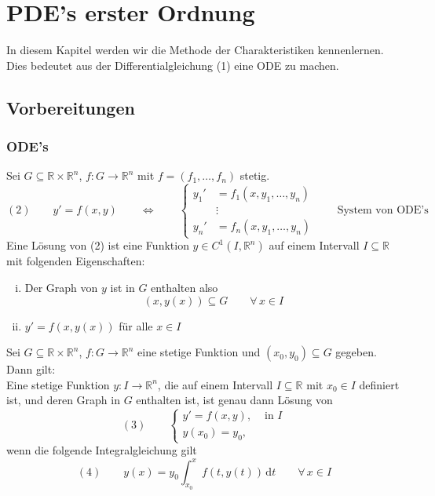 \section{PDE's erster Ordnung} 
\label{sec:pde_s_erster_ordnung}
In diesem Kapitel werden wir die Methode der Charakteristiken kennenlernen. Dies bedeutet aus der Differentialgleichung (1) eine ODE zu machen. 
\subsection{Vorbereitungen} 
\label{sub:vorbereitungen}
\subsubsection{ODE's} 
\label{ssub:ode_s}
Sei $G \subseteq \mathbb{R} \times \mathbb{R}^n$, $f: G \to  \mathbb{R}^n$ mit $f= (f_1,\dots,f_n)$ stetig.
\[
	(2) \qquad y' = f(x,y) \qquad \Leftrightarrow \qquad \begin{cases}
		y_1'&=f_1(x,y_1,\dots,y_n)\\
		&\vdots \\
		y_n' &= f_n(x,y_1,\dots,y_n)
	\end{cases}\qquad \text{System von ODE's}
\]
Eine Lösung von (2) ist eine Funktion $y \in C^1(I,\mathbb{R}^n)$ auf einem Intervall $I \subseteq \mathbb{R}$ mit folgenden Eigenschaften:
\begin{enumerate}[(i)]
	\item Der Graph von $y$ ist in $G$ enthalten also 
	\[
		(x,y(x)) \subseteq G \qquad \forall\, x \in I
	\]
	\item $y'=f(x,y(x))$ für alle $x \in I$
\end{enumerate}
\begin{satz}
	Sei $G \subseteq \mathbb{R}\times \mathbb{R}^n$, $f: G \to \mathbb{R}^n$ eine stetige Funktion und $(x_0,y_0) \subseteq G$ gegeben. Dann gilt: \\
	Eine stetige Funktion $y: I \to \mathbb{R}^n$, die auf einem Intervall $I \subseteq \mathbb{R}$ mit $x_0 \in I$ definiert ist, und deren Graph in $G$ enthalten
	 ist, ist genau dann Lösung von
	\[
		(3) \qquad  \begin{cases}
			y' = f(x,y), &\text{ in }I\\
			y(x_0) = y_0,
		\end{cases}
	\]wenn die folgende Integralgleichung gilt
	\[
		(4) \qquad y(x) = y_0 \int_{x_0}^{x} f(t,y(t)) \,\mathrm{d}t \qquad \forall\, x \in I
	\]
\end{satz}
